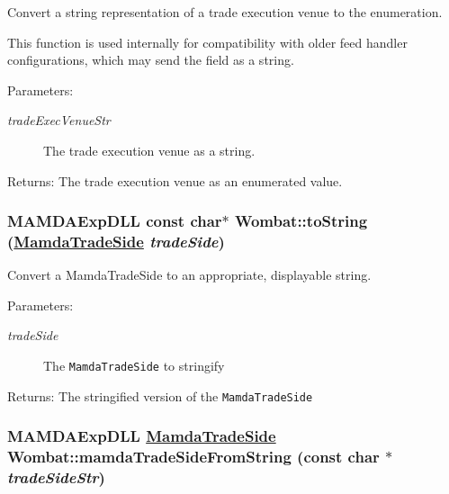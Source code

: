 Convert a string representation of a trade execution venue to the enumeration. 

This function is used internally for compatibility with older feed handler configurations, which may send the field as a string.

\begin{Desc}
\item[Parameters:]
\begin{description}
\item[{\em trade\-Exec\-Venue\-Str}]The trade execution venue as a string.\end{description}
\end{Desc}
\begin{Desc}
\item[Returns:]The trade execution venue as an enumerated value. \end{Desc}
\hypertarget{namespaceWombat_59c8440eb9763aa40fe4377387c3ce8d}{
\subsubsection[toString]{\setlength{\rightskip}{0pt plus 5cm}MAMDAExp\-DLL const char$\ast$ Wombat::to\-String (\hyperlink{namespaceWombat_e22aa41efabe0fe38b2d72577790ad3e}{Mamda\-Trade\-Side} {\em trade\-Side})}}
\label{namespaceWombat_59c8440eb9763aa40fe4377387c3ce8d}


Convert a Mamda\-Trade\-Side to an appropriate, displayable string. 

\begin{Desc}
\item[Parameters:]
\begin{description}
\item[{\em trade\-Side}]The {\tt Mamda\-Trade\-Side} to stringify\end{description}
\end{Desc}
\begin{Desc}
\item[Returns:]The stringified version of the {\tt Mamda\-Trade\-Side} \end{Desc}
\hypertarget{namespaceWombat_043afc291514ada0e9193f26bd8c89f2}{
\subsubsection[mamdaTradeSideFromString]{\setlength{\rightskip}{0pt plus 5cm}MAMDAExp\-DLL \hyperlink{namespaceWombat_e22aa41efabe0fe38b2d72577790ad3e}{Mamda\-Trade\-Side} Wombat::mamda\-Trade\-Side\-From\-String (const char $\ast$ {\em trade\-Side\-Str})}}
\label{namespaceWombat_043afc291514ada0e9193f26bd8c89f2}


